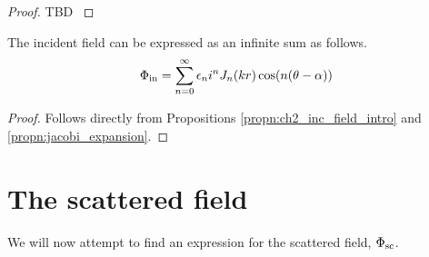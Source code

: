     \begin{proof} TBD \cite[$\S$2.5]{martin06scattering}
    \end{proof}
%
    \begin{propn}\label{propn:ch2_inc_field_infty_sum}
    The incident field can be expressed as an infinite sum as follows.
        \begin{equation*}\label{eq:ch2_inc_field_infty_sum}
            \Phi_{\text{in}} = \sum^{\infty}_{n=0} \epsilon_n i^n J_n(kr) \cos (n(\theta - \alpha))
        \end{equation*}
    \end{propn}
    \begin{proof}
    Follows directly from Propositions \ref{propn:ch2_inc_field_intro} and  \ref{propn:jacobi_expansion}.
    \end{proof}
\section{The scattered field}\label{ss:scattered_field}
We will now attempt to find an expression for the scattered field, $\Phi_{\text{sc}}$.
